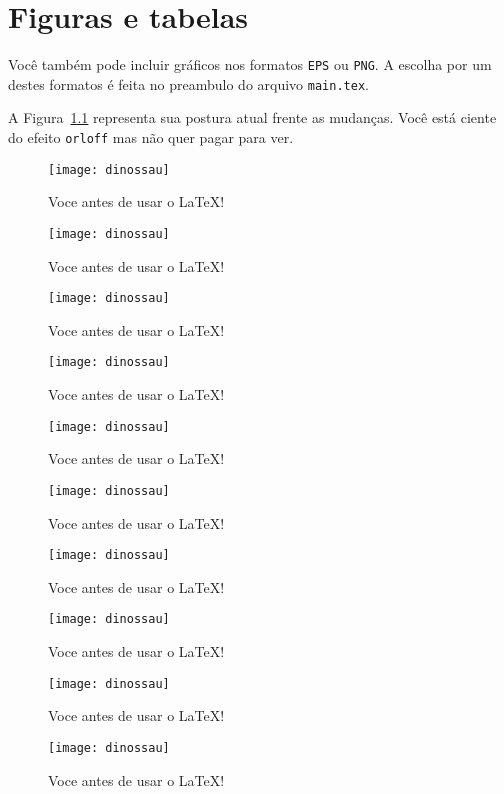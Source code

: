 
\chapter{Figuras e tabelas}

Você também pode incluir gráficos nos formatos \texttt{EPS} ou \texttt{PNG}. A escolha por um destes formatos é feita no preambulo do arquivo \texttt{main.tex}. 

A Figura~\ref{dinosaur} representa sua postura atual frente as mudanças.
Você está ciente do efeito \texttt{orloff} mas não quer pagar para
ver. \begin{figure}[htbp]
\centering \texttt{[image: dinossau]} \caption{Voce antes de usar o LaTeX!}%
\label{dinosaur}%
\end{figure}
\begin{figure}[htbp]
\centering \texttt{[image: dinossau]} \caption{Voce antes de usar o LaTeX!}%
\label{dinosaur1}%
\end{figure}
\begin{figure}[htbp]
\centering \texttt{[image: dinossau]} \caption{Voce antes de usar o LaTeX!}%
\label{dinosaur2}%
\end{figure}
\begin{figure}[htbp]
\centering \texttt{[image: dinossau]} \caption{Voce antes de usar o LaTeX!}%
\label{dinosaur3}%
\end{figure}
\begin{figure}[htbp]
\centering \texttt{[image: dinossau]} \caption{Voce antes de usar o LaTeX!}%
\label{dinosaur4}%
\end{figure}
\begin{figure}[htbp]
\centering \texttt{[image: dinossau]} \caption{Voce antes de usar o LaTeX!}%
\label{dinosaur5}%
\end{figure}
\begin{figure}[htbp]
\centering \texttt{[image: dinossau]} \caption{Voce antes de usar o LaTeX!}%
\label{dinosaur6}%
\end{figure}
\begin{figure}[htbp]
\centering \texttt{[image: dinossau]} \caption{Voce antes de usar o LaTeX!}%
\label{dinosaur7}%
\end{figure}
\begin{figure}[htbp]
\centering \texttt{[image: dinossau]} \caption{Voce antes de usar o LaTeX!}%
\label{dinosaur8}%
\end{figure}
\begin{figure}[htbp]
\centering \texttt{[image: dinossau]} \caption{Voce antes de usar o LaTeX!}%
\label{dinosaur9}%
\end{figure}

